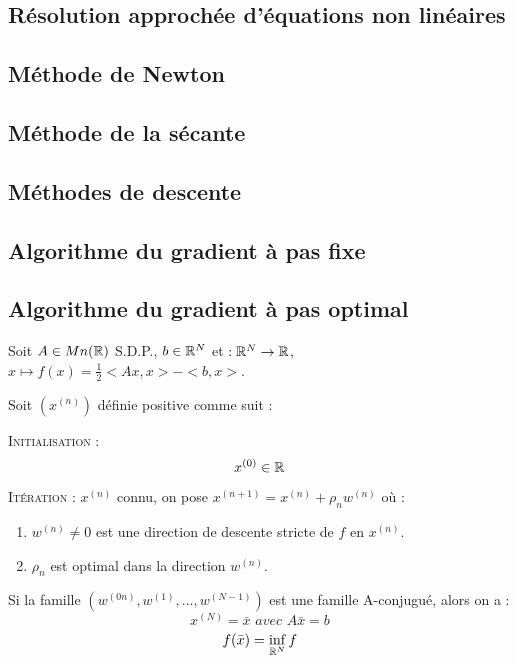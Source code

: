 \subsection{Résolution approchée d'équations non linéaires}
\subsection{Méthode de Newton}



\subsection{Méthode de la sécante}
\subsection{Méthodes de descente}
\subsection{Algorithme du gradient à pas fixe}
\subsection{Algorithme du gradient à pas optimal}







\begin{proposition}

Soit $A \in Mn(\mathbb{R})$ S.D.P., $b\in\mathbb{R}^N$ et $:\mathbb{R}^N\rightarrow\mathbb{R}$, $x\mapsto f(x)=\frac{1}{2}<Ax,x>-<b,x>$.

Soit $(x^{(n)})$ définie positive comme suit :

\textsc{Initialisation :}
\[x^{(0)}\in\mathbb{R}\]

\textsc{Itération :}
$x^{(n)}$ connu, on pose $x^{(n+1)}=x^{(n)}+\rho_n w^{(n)}$ où :
\begin{enumerate}
\item $w^{(n)} \ne 0$ est une direction de descente stricte de $f$ en $x^{(n)}$.
\item $\rho_n$ est optimal dans la direction $w^{(n)}$.
\end{enumerate}

Si la famille $(w^{(0n)}, w^{(1)}, \dots, w^{(N-1)})$ est une famille A-conjugué, alors on a :
\[ x^{(N)}=\bar{x} \textit{ avec } A\bar{x}=b \]
\[ f(\bar{x})=\inf_{\mathbb{R}^N} f \]

\end{proposition}

